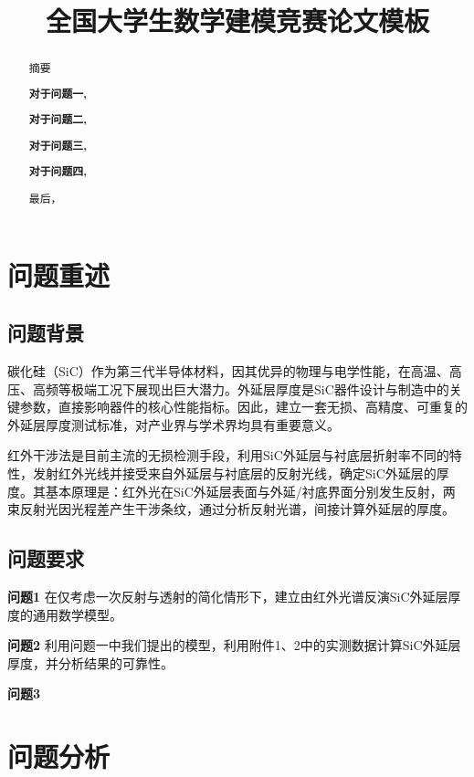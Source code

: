 \documentclass{cumcmthesis}
\title{全国大学生数学建模竞赛论文模板}  %
\begin{document}
\maketitle

\begin{abstract}
摘要

\textbf{对于问题一,}

\textbf{对于问题二,}

\textbf{对于问题三,}

\textbf{对于问题四,}

最后，



\end{abstract}

\section{问题重述}
\subsection{问题背景}
碳化硅（SiC）作为第三代半导体材料，因其优异的物理与电学性能，在高温、高压、高频等极端工况下展现出巨大潜力。外延层厚度是SiC器件设计与制造中的关键参数，直接影响器件的核心性能指标。因此，建立一套无损、高精度、可重复的外延层厚度测试标准，对产业界与学术界均具有重要意义。

红外干涉法是目前主流的无损检测手段，利用SiC外延层与衬底层折射率不同的特性，发射红外光线并接受来自外延层与衬底层的反射光线，确定SiC外延层的厚度。其基本原理是：红外光在SiC外延层表面与外延/衬底界面分别发生反射，两束反射光因光程差产生干涉条纹，通过分析反射光谱，间接计算外延层的厚度。

\subsection{问题要求}

\textbf{问题1}  
在仅考虑一次反射与透射的简化情形下，建立由红外光谱反演SiC外延层厚度的通用数学模型。

\textbf{问题2}  
利用问题一中我们提出的模型，利用附件1、2中的实测数据计算SiC外延层厚度，并分析结果的可靠性。

\textbf{问题3} 


\section{问题分析}
\end{document}
